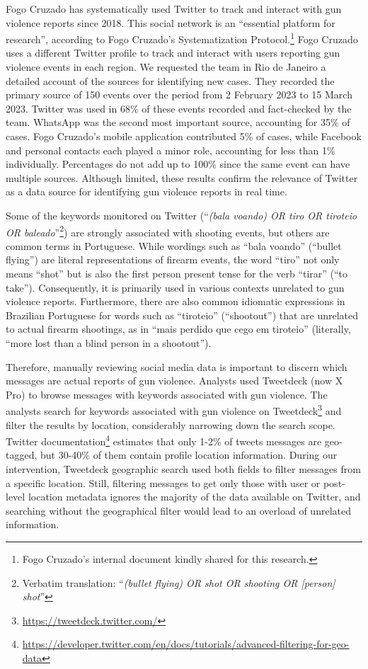 \documentclass[11pt,letterpaper]{article}
\begin{document}
Fogo Cruzado has systematically used Twitter to track and interact with gun violence reports since 2018. This social network is an ``essential platform for research'', according to Fogo Cruzado's Systematization Protocol.\footnote{Fogo Cruzado's internal document kindly shared for this research.} Fogo Cruzado uses a different Twitter profile to track and interact with users reporting gun violence events in each region. We requested the team in Rio de Janeiro a detailed account of the sources for identifying new cases. They recorded the primary source of 150 events over the period from 2 February 2023 to 15 March 2023. Twitter was used in 68\% of these events recorded and fact-checked by the team. WhatsApp was the second most important source, accounting for 35\% of cases. Fogo Cruzado's mobile application contributed 5\% of cases, while Facebook and personal contacts each played a minor role, accounting for less than 1\% individually. Percentages do not add up to 100\% since the same event can have multiple sources. Although limited, these results confirm the relevance of Twitter as a data source for identifying gun violence reports in real time. 

Some of the keywords monitored on Twitter (``\textit{(bala voando) OR tiro OR tiroteio OR baleado}”\footnote{Verbatim translation: ``\textit{(bullet flying) OR shot OR shooting OR [person] shot}”}) are strongly associated with shooting events, but others are common terms in Portuguese. While wordings such as ``bala voando” (``bullet flying”) are literal representations of firearm events, the word ``tiro” not only means ``shot” but is also the first person present tense for the verb ``tirar” (``to take”). Consequently, it is primarily used in various contexts unrelated to gun violence reports. Furthermore, there are also common idiomatic expressions in Brazilian Portuguese for words such as ``tiroteio” (``shootout”) that are unrelated to actual firearm shootings, as in ``mais perdido que cego em tiroteio” (literally, ``more lost than a blind person in a shootout”). 

Therefore, manually reviewing social media data is important to discern which messages are actual reports of gun violence. Analysts used Tweetdeck (now X Pro) to browse messages with keywords associated with gun violence. The analysts search for keywords associated with gun violence on Tweetdeck\footnote{\href{https://tweetdeck.twitter.com/}{https://tweetdeck.twitter.com/}} and filter the results by location, considerably narrowing down the search scope. Twitter documentation\footnote{\href{https://developer.twitter.com/en/docs/tutorials/advanced-filtering-for-geo-data}{https://developer.twitter.com/en/docs/tutorials/advanced-filtering-for-geo-data}} estimates that only 1-2\% of tweets messages are geo-tagged, but 30-40\% of them contain profile location information. During our intervention, Tweetdeck geographic search used both fields to filter messages from a specific location. Still, filtering messages to get only those with user or post-level location metadata ignores the majority of the data available on Twitter, and searching without the geographical filter would lead to an overload of unrelated information. 
\end{document}
